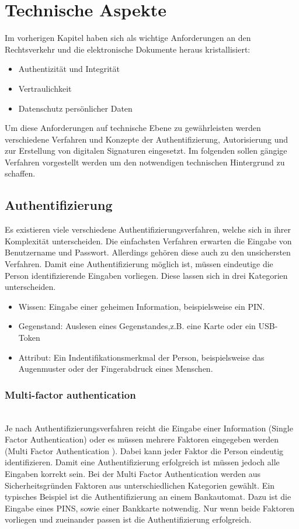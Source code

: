 
\section{Technische Aspekte}
Im vorherigen Kapitel haben sich als wichtige Anforderungen an den Rechtsverkehr und die elektronische Dokumente heraus kristallisiert:
\begin{itemize}
\item Authentizität und Integrität
\item Vertraulichkeit
\item Datenschutz persönlicher Daten
\end{itemize}
Um diese Anforderungen auf technische Ebene zu gewährleisten werden verschiedene Verfahren und Konzepte der Authentifizierung, Autorisierung und zur Erstellung von digitalen Signaturen eingesetzt. Im folgenden sollen gängige Verfahren vorgestellt werden um den notwendigen  technischen Hintergrund zu schaffen. 
\subsection{Authentifizierung}
Es existieren viele verschiedene Authentifizierungsverfahren, welche sich in ihrer Komplexität unterscheiden. Die einfachsten Verfahren erwarten die Eingabe von Benutzername und Passwort. Allerdings gehören diese auch zu den unsichersten Verfahren. Damit eine Authentifizierung möglich ist, müssen eindeutige die Person identifizierende Eingaben vorliegen. Diese lassen sich in drei Kategorien unterscheiden.
\begin{itemize}
\item Wissen: Eingabe einer geheimen Information, beispielsweise ein PIN.
\item Gegenstand: Auslesen eines Gegenstandes,z.B. eine Karte oder ein USB-Token
\item Attribut: Ein Indentifikationsmerkmal der Person, beispielsweise das Augenmuster oder der Fingerabdruck eines Menschen.
\end{itemize}
\subsubsection{Multi-factor authentication}\hspace*{\fill} \\
Je nach Authentifizierungsverfahren reicht die Eingabe einer Information (Single Factor Authentication) oder es müssen mehrere Faktoren eingegeben werden (Multi Factor Authentication \cite{thomas2015multi}).
Dabei kann jeder Faktor die Person eindeutig identifizieren. Damit eine Authentifizierung erfolgreich ist müssen jedoch alle Eingaben korrekt sein. Bei der Multi Factor Authentication werden aus Sicherheitsgründen Faktoren aus unterschiedlichen Kategorien gewählt. Ein typisches Beispiel ist die Authentifizierung an einem Bankautomat. Dazu ist die Eingabe eines PINS, sowie einer Bankkarte notwendig. Nur wenn beide Faktoren vorliegen und zueinander passen ist die Authentifizierung erfolgreich. 
